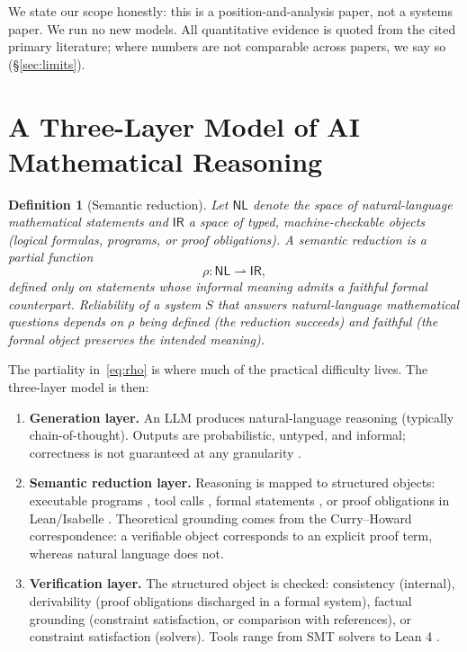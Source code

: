 \documentclass[11pt,a4paper]{article}
\newtheorem{definition}{Definition}
\newcommand{\ir}{\mathsf{IR}}
\newcommand{\nl}{\mathsf{NL}}
\begin{document}
We state our scope honestly: this is a position-and-analysis paper, not a systems paper. We run no new models. All quantitative evidence is quoted from the cited primary literature; where numbers are not comparable across papers, we say so (\S\ref{sec:limits}).

\section{A Three-Layer Model of AI Mathematical Reasoning}\label{sec:model}

\begin{definition}[Semantic reduction]
Let $\nl$ denote the space of natural-language mathematical statements and $\ir$ a space of typed, machine-checkable objects (logical formulas, programs, or proof obligations). A \emph{semantic reduction} is a partial function
\begin{equation}
\rho : \nl \rightharpoonup \ir ,
\label{eq:rho}
\end{equation}
defined only on statements whose informal meaning admits a faithful formal counterpart. Reliability of a system $S$ that answers natural-language mathematical questions depends on $\rho$ being \emph{defined} (the reduction succeeds) and \emph{faithful} (the formal object preserves the intended meaning).
\end{definition}

The partiality in~\eqref{eq:rho} is where much of the practical difficulty lives. The three-layer model is then:

\begin{enumerate}
  \item \textbf{Generation layer.} An LLM produces natural-language reasoning (typically chain-of-thought). Outputs are probabilistic, untyped, and informal; correctness is not guaranteed at any granularity \citep{wei2022cot,lewkowycz2022minerva}.
  \item \textbf{Semantic reduction layer.} Reasoning is mapped to structured objects: executable programs \citep{gao2023pal,chen2023pot}, tool calls \citep{schick2023toolformer}, formal statements \citep{zhou2024dtv}, or proof obligations in Lean/Isabelle \citep{jiang2023draft,yang2023leandojo}. Theoretical grounding comes from the Curry--Howard correspondence: a verifiable object corresponds to an explicit proof term, whereas natural language does not.
  \item \textbf{Verification layer.} The structured object is checked: consistency (internal), derivability (proof obligations discharged in a formal system), factual grounding (constraint satisfaction, or comparison with references), or constraint satisfaction (solvers). Tools range from SMT solvers to Lean 4 \citep{demoura2021lean4}.
\end{enumerate}
\end{document}
